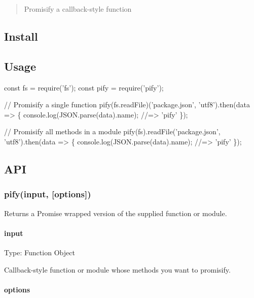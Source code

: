 \begin{quote}
Promisify a callback-\/style function \end{quote}


\subsection*{Install}




\subsection*{Usage}


\begin{DoxyCode}
const fs = require('fs');
const pify = require('pify');

// Promisify a single function
pify(fs.readFile)('package.json', 'utf8').then(data => \{
  console.log(JSON.parse(data).name);
  //=> 'pify'
\});

// Promisify all methods in a module
pify(fs).readFile('package.json', 'utf8').then(data => \{
  console.log(JSON.parse(data).name);
  //=> 'pify'
\});
\end{DoxyCode}


\subsection*{A\+PI}

\subsubsection*{pify(input, \mbox{[}options\mbox{]})}

Returns a {\ttfamily Promise} wrapped version of the supplied function or module.

\paragraph*{input}

Type\+: {\ttfamily Function} {\ttfamily Object}

Callback-\/style function or module whose methods you want to promisify.

\paragraph*{options}

